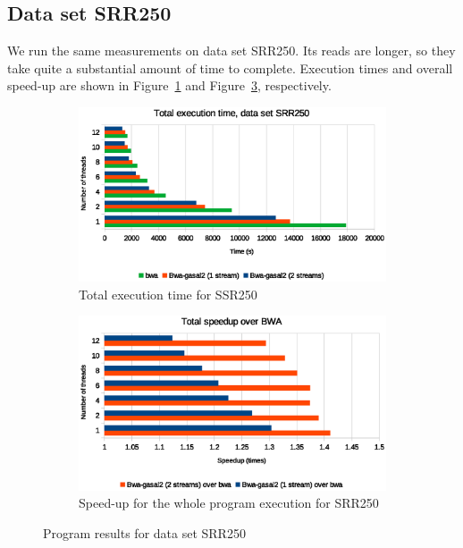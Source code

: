 \subsection{Data set SRR250}

We run the same measurements on data set SRR250. Its reads are longer, so they take quite a substantial amount of time to complete. Execution times and overall speed-up are shown in Figure~\ref{fig:total-exec-time-srr250} and Figure~\ref{fig:total-exec-speed-up-srr250}, respectively.


\begin{figure}[p]
	\centering
	\begin{subfigure}[t]{1\textwidth}
		\centering
		\includegraphics[width=1\textwidth]{srr250/total-exec-time-srr250}
		\caption{Total execution time for SSR250}
		\label{fig:total-exec-time-srr250}
	\end{subfigure}%
	
	\begin{subfigure}[b]{1\textwidth}
		\centering
		\includegraphics[width=1\textwidth]{srr250/total-exec-speed-up-srr250}
		\caption{Speed-up for the whole program execution for SRR250}
		\label{fig:total-exec-speed-up-srr250}
	\end{subfigure}
	\caption{Program results for data set SRR250}
\end{figure}

